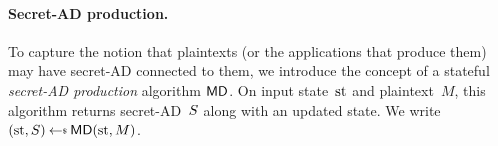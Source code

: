 \paragraph{Secret-AD production. } To capture the notion that plaintexts (or the applications that produce them) may have secret-AD connected to them, we introduce the concept of a stateful \emph{secret-AD production} algorithm $\mathsf{MD}$.  On input state~$\mathrm{st}$ and plaintext~$M$, this algorithm returns secret-AD~$S$ along with an updated state.  We write $(\st,S) \getsr \mdalg(\st,M)$.  




